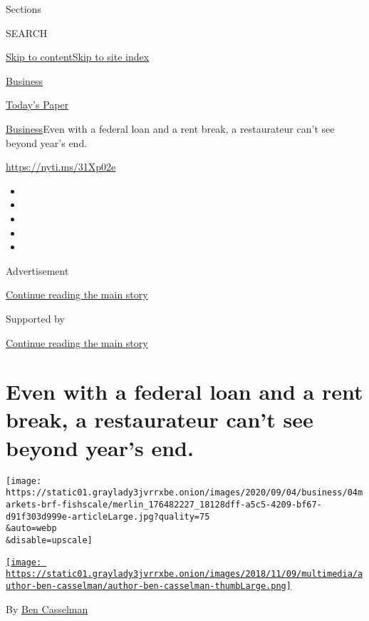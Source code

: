 Sections

SEARCH

\protect\hyperlink{site-content}{Skip to
content}\protect\hyperlink{site-index}{Skip to site index}

\href{https://www.nytimes3xbfgragh.onion/section/business}{Business}

\href{https://myaccount.nytimes3xbfgragh.onion/auth/login?response_type=cookie\&client_id=vi}{}

\href{https://www.nytimes3xbfgragh.onion/section/todayspaper}{Today's
Paper}

\href{/section/business}{Business}\textbar{}Even with a federal loan and
a rent break, a restaurateur can't see beyond year's end.

\url{https://nyti.ms/31Xp02e}

\begin{itemize}
\item
\item
\item
\item
\item
\end{itemize}

Advertisement

\protect\hyperlink{after-top}{Continue reading the main story}

Supported by

\protect\hyperlink{after-sponsor}{Continue reading the main story}

\hypertarget{even-with-a-federal-loan-and-a-rent-break-a-restaurateur-cant-see-beyond-years-end}{%
\section{Even with a federal loan and a rent break, a restaurateur can't
see beyond year's
end.}\label{even-with-a-federal-loan-and-a-rent-break-a-restaurateur-cant-see-beyond-years-end}}

\texttt{[image: https://static01.graylady3jvrrxbe.onion/images/2020/09/04/business/04markets-brf-fishscale/merlin\_176482227\_18128dff-a5c5-4209-bf67-d91f303d999e-articleLarge.jpg?quality=75\\\&auto=webp\\\&disable=upscale]}

\href{https://www.nytimes3xbfgragh.onion/by/ben-casselman}{\texttt{[image: https://static01.graylady3jvrrxbe.onion/images/2018/11/09/multimedia/author-ben-casselman/author-ben-casselman-thumbLarge.png]}}

By \href{https://www.nytimes3xbfgragh.onion/by/ben-casselman}{Ben
Casselman}

